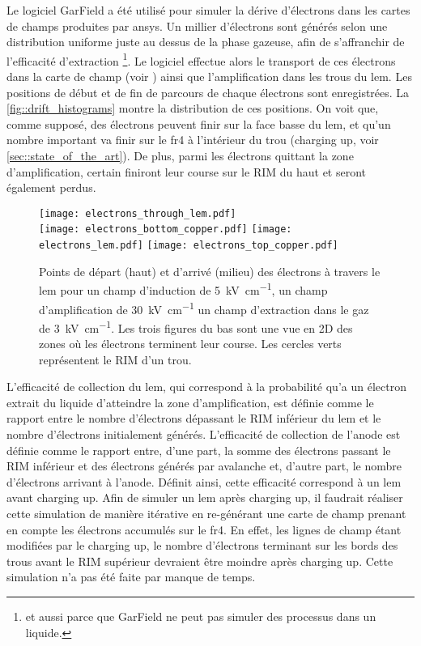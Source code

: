       Le logiciel GarField a été utilisé pour simuler la dérive d'électrons dans les cartes de champs produites par \gls{ansys}. Un millier d'électrons sont générés selon une distribution uniforme juste au dessus de la phase gazeuse, afin de s'affranchir de l'efficacité d'extraction \footnote{et aussi parce que GarField ne peut pas simuler des processus dans un liquide.}. Le logiciel effectue alors le transport de ces électrons dans la carte de champ (voir \cite{garfield}) ainsi que l'amplification dans les trous du \gls{lem}. Les positions de début et de fin de parcours de chaque électrons sont enregistrées. La \autoref{fig::drift_histograms} montre la distribution de ces positions. On voit que, comme supposé, des électrons peuvent finir sur la face basse du \gls{lem}, et qu'un nombre important va finir sur le \gls{fr4} à l'intérieur du trou (charging up, voir \autoref{sec::state_of_the_art}). De plus, parmi les électrons quittant la zone d'amplification, certain finiront leur course sur le RIM du haut et seront également perdus.

      \begin{figure}[htpb]
        \centering
        \texttt{[image: electrons\_through\_lem.pdf]}\\\vspace{0.1cm}
        \texttt{[image: electrons\_bottom\_copper.pdf]}
        \texttt{[image: electrons\_lem.pdf]}
        \texttt{[image: electrons\_top\_copper.pdf]}
        \caption[Points de départ et d'arrivé des électrons à travers le LEM]{\label{fig::drift_histograms}Points de départ (haut) et d'arrivé (milieu) des électrons à travers le \gls{lem} pour un champ d'induction de \SI{5}{\kilo\volt\per\centi\meter}, un champ d'amplification de \SI{30}{\kilo\volt\per\centi\meter} un champ d'extraction dans le gaz de \SI{3}{\kilo\volt\per\centi\meter}. Les trois figures du bas sont une vue en 2D des zones où les électrons terminent leur course. Les cercles verts représentent le RIM d'un trou.}
      \end{figure}
          
      L'efficacité de collection du \gls{lem}, qui correspond à la probabilité qu'a un électron extrait du liquide d'atteindre la zone d'amplification, est définie comme le rapport entre le nombre d'électrons dépassant le RIM inférieur du \gls{lem} et le nombre d'électrons initialement générés. L'efficacité de collection de l'anode est définie comme le rapport entre, d'une part, la somme des électrons passant le RIM inférieur et des électrons générés par avalanche et, d'autre part, le nombre d'électrons arrivant à l'anode. Définit ainsi, cette efficacité correspond à un \gls{lem} avant charging up. Afin de simuler un \gls{lem} après charging up, il faudrait réaliser cette simulation de manière itérative en re-générant une carte de champ prenant en compte les électrons accumulés sur le \gls{fr4}. En effet, les lignes de champ étant modifiées par le charging up, le nombre d'électrons terminant sur les bords des trous avant le RIM supérieur devraient être moindre après charging up. Cette simulation n'a pas été faite par manque de temps.
        
